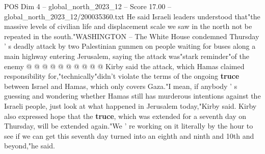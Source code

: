 \begin{textsample}{POS Dim 4 – global\_north\_2023\_12 – Score 17.00 – global\_north\_2023\_12/200035360.txt}
He said Israeli leaders understood that"the massive levels of civilian life and displacement scale we saw in the north not be repeated in the south."WASHINGTON -- The White House condemned Thursday ' s deadly attack by two Palestinian gunmen on people waiting for buses along a main highway entering Jerusalem, saying the attack was"stark reminder"of the enemy @ @ @ @ @ @ @ @ @ @ Kirby said the attack, which Hamas claimed responsibility for,"technically"didn't violate the terms of the ongoing \textbf{truce} between Israel and Hamas, which only covers Gaza."I mean, if anybody ' s guessing and wondering whether Hamas still has murderous intentions against the Israeli people, just look at what happened in Jerusalem today,"Kirby said.
Kirby also expressed hope that the \textbf{truce}, which was extended for a seventh day on Thursday, will be extended again."We ' re working on it literally by the hour to see if we can get this seventh day turned into an eighth and ninth and 10th and beyond,"he said.

\end{textsample}
